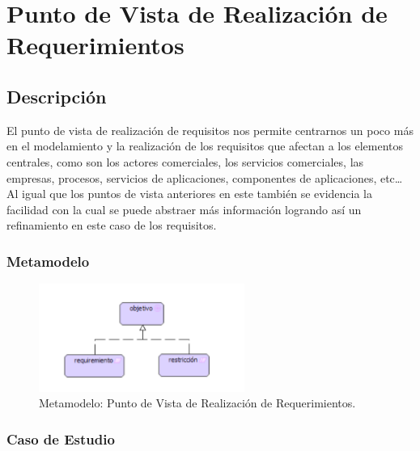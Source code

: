 \section{Punto de Vista de Realización de Requerimientos}
\subsection{Descripción}
El punto de vista de realización de requisitos nos permite centrarnos un poco más en el modelamiento y la realización de los requisitos que afectan a los elementos centrales, como son los actores comerciales, los servicios comerciales, las empresas, procesos, servicios de aplicaciones, componentes de aplicaciones, etc… Al igual que los puntos de vista anteriores en este también se evidencia la facilidad con la cual se puede abstraer más información logrando así un refinamiento en este caso de los requisitos.

\subsubsection{Metamodelo}
\begin{figure}[h]
	\centering
	\includegraphics[width=0.6\textwidth]{imagenes/Metamodelos/Motivacion/meta_Realizacion_Requerimientos.pdf}
	\caption{Metamodelo: Punto de Vista de Realización de Requerimientos.}
	\label{fig:gap_analysis}
\end{figure}

\subsubsection{Caso de Estudio}


